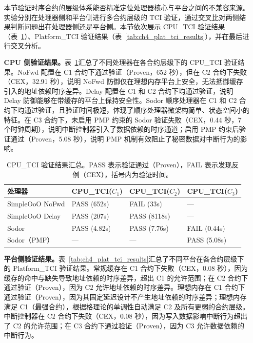 本节验证时序合约的层级体系能否精准定位处理器核心与平台之间的不兼容来源。实验分别在处理器侧和平台侧进行多合约层级的 TCI 验证，通过交叉比对两侧结果判断问题出在处理器侧还是平台侧。本节依次展示 CPU\_TCI 验证结果（表~\ref{tab:ch4_cpu_tci_results}）、Platform\_TCI 验证结果（表~\ref{tab:ch4_plat_tci_results}），并在最后进行交叉分析。

\textbf{CPU 侧验证结果。}表~\ref{tab:ch4_cpu_tci_results}汇总了不同处理器在各合约层级下的 CPU\_TCI 验证结果。NoFwd 配置在 C1 合约下通过验证（Proven，652 秒），但在 C2 合约下失败（CEX，32.91 秒），说明 NoFwd 防御仅在理想内存平台上安全，无法抵御缓存引入的地址依赖时序差异。Delay 配置在 C1 和 C2 合约下均通过验证，说明 Delay 防御能够在带缓存的平台上保持安全性。Sodor 顺序处理器在 C1 和 C2 合约下均通过验证，且验证时间极短，体现了顺序处理器微架构简单、状态空间小的特征。在 C3 合约下，未启用 PMP 约束的 Sodor 验证失败（CEX，0.44 秒，7 个时钟周期），说明中断控制器引入了数据依赖的时序通道；启用 PMP 约束后验证通过（Proven，5.08 秒），说明 PMP 机制有效阻止了秘密数据对中断行为的影响。

\begin{table}[htb]
    \centering
    \caption{CPU\_TCI 验证结果汇总。PASS 表示验证通过（Proven），FAIL 表示发现反例（CEX），括号内为验证时间。}
    \label{tab:ch4_cpu_tci_results}
    \begin{tabular}{llll}
        \hline
        \textbf{处理器} & \textbf{CPU\_TCI($C_1$)} & \textbf{CPU\_TCI($C_2$)} & \textbf{CPU\_TCI($C_3$)} \\
        \hline
        SimpleOoO NoFwd & PASS (652s) & FAIL (33s) & — \\
        SimpleOoO Delay & PASS (207s) & PASS (8118s) & — \\
        Sodor & PASS (4.82s) & PASS (7.76s) & FAIL (0.44s) \\
        Sodor（PMP） & — & — & PASS (5.08s) \\
        \hline
    \end{tabular}
\end{table}

\textbf{平台侧验证结果。}表~\ref{tab:ch4_plat_tci_results}汇总了不同平台在各合约层级下的 Platform\_TCI 验证结果。常规缓存在 C1 合约下失败（CEX，0.08 秒），因为缓存的命中与缺失导致地址依赖的时序差异，超出 C1 的允许范围；在 C2 合约下通过验证（Proven），因为 C2 允许地址依赖的时序差异。理想内存在 C1 合约下通过验证（Proven），因为其固定延迟设计不产生地址依赖的时序差异；理想内存满足 C1（最强合约），根据格理论的单调性自动满足 C2 及所有更弱的合约层级。中断控制器在 C2 合约下失败（CEX，0.08 秒），因为写入数据影响中断行为超出了 C2 的允许范围；在 C3 合约下通过验证（Proven），因为 C3 允许数据依赖的中断行为。

